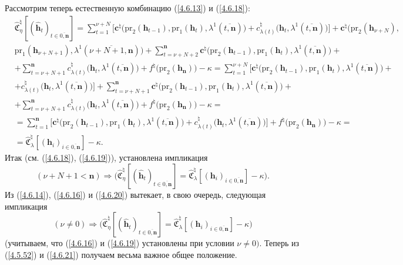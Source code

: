 \documentclass[12pt,twoside]{report}
\newcommand{\bfn}{\begin{equation}}
\newcommand{\efn}{\end{equation}}
\newcommand{\ov}{\overline}
\newcommand{\la}{\lambda}
\newcommand{\zc}{{\mathbf c}}
\newcommand{\nn}{{\mathbf n}}
\begin{document}
{{Рассмотрим теперь естественную комбинацию (\ref{4.6.13}) и (\ref{4.6.18}):
\begin{eqnarray}
&\widehat{\mathfrak{C}}_\eta^\natural[(\hat{\mathbf{h}}_t)_{t\in\ov{0,\nn}}]=
 \sum\limits_{t=1}^{\nu+N}\bigl[\zc^\natural\bigl(\mathrm{pr}_2(\mathbf{h}_{t-1}),\mathrm{pr}_1
 (\mathbf{h}_t), \la^1(\ov{t,\nn})\bigl) + c_{\la(t)}^\natural\bigl(\mathbf{h}_t,\la^1(\ov{t,\nn})\bigl)\bigl] +
\zc^\natural\bigl(\mathrm{pr}_2(\mathbf{h}_{\nu+N}),
 &\nonumber\\
&\mathrm{pr}_1(\mathbf{h}_{\nu+N+1}), \la^1(\ov{\nu+N+1,\nn})\bigl)+
\sum\limits_{t=\nu+N+2}^\nn\zc^\natural\bigl(\mathrm{pr}_2(\mathbf{h}_{t-1}),\mathrm{pr}_1
(\mathbf{h}_t), \la^1(\ov{t,\nn})\bigl) +
&\nonumber\\
&+ \sum\limits_{t=\nu+N+1}^\nn c_{\la(t)}^\natural\bigl(\mathbf{h}_t,\la^1(\ov{t,\nn})\bigl)
+f^\natural\bigl(\mathrm{pr}_2(\mathbf{h}_\nn)\bigl) - \kappa = \sum\limits_{t=1}^{\nu+N}\bigl[\zc^\natural
(\mathrm{pr}_2(\mathbf{h}_{t-1}),\mathrm{pr}_1(\mathbf{h}_t), \la^1(\ov{t,\nn})\bigl) +
&\nonumber\\
&+c_{\la(t)}^{\natural}\bigl(\mathbf{h}_t,\la^1(\ov{t,\nn})\bigl)\bigl]
+\sum\limits_{t=\nu+N+1}^\nn\zc^\natural\bigl(\mathrm{pr}_2(\mathbf{h}_{t-1}),\mathrm{pr}_1
(\mathbf{h}_t),\la^1(\ov{t,\nn})\bigl) +
&\nonumber\\
&+\sum\limits_{t=\nu+N+1}^\nn c_{\la(t)}^\natural\bigl(\mathbf{h}_t,\la^1(\ov{t,\nn})\bigl)
+f^\natural\bigl(\mathrm{pr}_2(\mathbf{h}_\nn)\bigl) - \kappa  =
&\nonumber\\
&=\sum\limits_{t=1}^\nn \bigl[\zc^\natural\bigl(\mathrm{pr}_2(\mathbf{h}_{t-1}),\mathrm{pr}_1(\mathbf{h}_t),
\la^1(\ov{t,\nn})\bigl) + c_{\la(t)}^\natural(\mathbf{h}_t,\la^1(\ov{t,\nn})\bigl)\bigl] +
f^\natural\bigl(\mathrm{pr}_2(\mathbf{h}_\nn)\bigl) - \kappa=
&\nonumber\\
&= \widehat{\mathfrak{C}}_\la^\natural[(\mathbf{h}_i)_{i\in\ov{0,\nn}}]
 - \kappa.
&\label{4.6.19}
\end{eqnarray}
Итак (см. (\ref{4.6.18}), (\ref{4.6.19})), установлена импликация
\bfn\label{4.6.20}
(\nu+N+1 < \nn)\Longrightarrow \bigl(\widehat{\mathfrak{C}}_\eta^\natural[(\hat{\mathbf{h}}_t)_{t\in\ov{0,\nn}}] =
\widehat{\mathfrak{C}}_\la^\natural[(\mathbf{h}_i)_{i\in\ov{0,\nn}}]  - \kappa\bigl).
\efn
Из (\ref{4.6.14}), (\ref{4.6.16}) и (\ref{4.6.20}) вытекает, в свою очередь, следующая импликация
\bfn\label{4.6.21}(\nu\neq 0) \Longrightarrow
\bigl(\widehat{\mathfrak{C}}_\eta^\natural[(\hat{\mathbf{h}}_t)_{t\in\ov{0,\nn}}] =
\widehat{\mathfrak{C}}_\la^\natural[(\mathbf{h}_i)_{i\in\ov{0,\nn}}]  - \kappa\bigl)
\efn
(учитываем, что (\ref{4.6.16}) и (\ref{4.6.19}) установлены при условии $\nu \neq 0).$
Теперь из (\ref{4.5.52}) и (\ref{4.6.21}) получаем весьма важное общее положение.

}}
\end{document}
